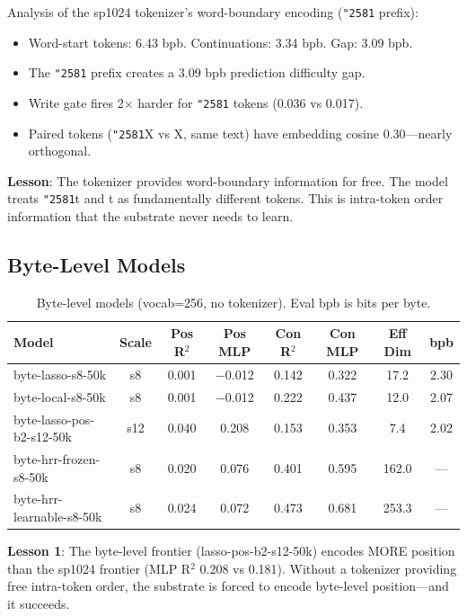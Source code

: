 \documentclass[11pt,a4paper]{article}
\begin{document}
Analysis of the sp1024 tokenizer's word-boundary encoding (\texttt{\char"2581} prefix):
\begin{itemize}
\item Word-start tokens: 6.43 bpb. Continuations: 3.34 bpb. Gap: 3.09 bpb.
\item The \texttt{\char"2581} prefix creates a 3.09 bpb prediction difficulty gap.
\item Write gate fires 2$\times$ harder for \texttt{\char"2581} tokens (0.036 vs 0.017).
\item Paired tokens (\texttt{\char"2581}X vs X, same text) have embedding cosine 0.30---nearly orthogonal.
\end{itemize}

\textbf{Lesson}: The tokenizer provides word-boundary information for free. The model treats \texttt{\char"2581}t and t as fundamentally different tokens. This is intra-token order information that the substrate never needs to learn.

\subsection{Byte-Level Models}

\begin{table}[h]
\centering
\caption{Byte-level models (vocab=256, no tokenizer). Eval bpb is bits per byte.}
\begin{tabular}{lccccccc}
\toprule
Model & Scale & Pos R$^2$ & Pos MLP & Con R$^2$ & Con MLP & Eff Dim & bpb \\
\midrule
byte-lasso-s8-50k & s8 & 0.001 & $-$0.012 & 0.142 & 0.322 & 17.2 & 2.30 \\
byte-local-s8-50k & s8 & 0.001 & $-$0.012 & 0.222 & 0.437 & 12.0 & 2.07 \\
byte-lasso-pos-b2-s12-50k & s12 & 0.040 & 0.208 & 0.153 & 0.353 & 7.4 & 2.02 \\
byte-hrr-frozen-s8-50k & s8 & 0.020 & 0.076 & 0.401 & 0.595 & 162.0 & --- \\
byte-hrr-learnable-s8-50k & s8 & 0.024 & 0.072 & 0.473 & 0.681 & 253.3 & --- \\
\bottomrule
\end{tabular}
\label{tab:byte}
\end{table}

\textbf{Lesson 1}: The byte-level frontier (lasso-pos-b2-s12-50k) encodes MORE position than the sp1024 frontier (MLP R$^2$ 0.208 vs 0.181). Without a tokenizer providing free intra-token order, the substrate is forced to encode byte-level position---and it succeeds.
\end{document}
